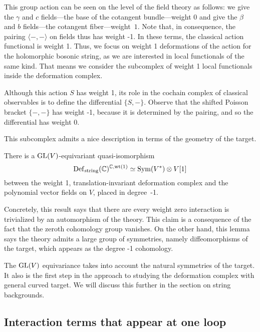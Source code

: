 This group action can be seen on the level of the field theory as follows: 
we give the $\gamma$ and $c$ fields---the base of the cotangent bundle---weight $0$ and give the $\beta$ and $b$ fields---the cotangent fiber---weight~$1$. 
Note that, in consequence, the pairing $\langle-,-\rangle$ on fields thus has weight -1.
In these terms, the classical action functional is weight 1. 
Thus, we focus on weight 1 deformations of the action for the holomorphic bosonic string,
as we are interested in local functionals of the same kind.
That means we consider the subcomplex of weight 1 local functionals inside the deformation complex.

\begin{rmk}\label{rmk: classical weights}
Although this action $S$ has weight 1, 
its role in the cochain complex of classical observables is to define the differential $\{S,-\}$.
Observe that the shifted Poisson bracket $\{-,-\}$ has weight -1, 
because it is determined by the pairing, 
and so the differential has weight 0. 
\end{rmk}

This subcomplex admits a nice description in terms of the geometry of the target.

\def\wt{{\rm wt}}

\begin{lem}
\label{lem: def complex wt zero} 
There is a ${\rm GL}(V)$-equivariant quasi-isomorphism
\[
\Def_{\rm string}(\CC)^{\CC, \wt(1)} \simeq \Sym(V^*) \tensor V[1]
\]
between the weight 1, translation-invariant deformation complex 
and the polynomial vector fields on $V$, placed in degree~-1.
\end{lem}

Concretely, this result says that there are every weight zero  interaction is trivialized by an automorphism of the theory.
This claim is a consequence of the fact that the zeroth cohomology group vanishes.
On the other hand, this lemma says the theory admits a large group of symmetries,
namely diffeomorphisms of the target, 
which appears as the degree -1 cohomology.

The ${\rm GL}(V)$ equivariance takes into account the natural symmetries of the target. 
It also is the first step in the approach to studying the deformation complex with general curved target. 
We will discuss this further in the section on string backgrounds. 

\subsection{Interaction terms that appear at one loop}

